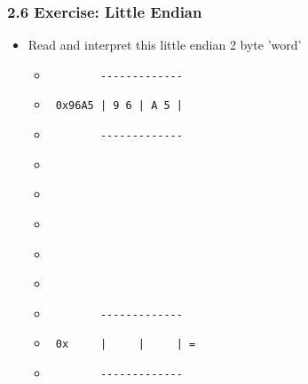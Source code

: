 \begin{frame}[fragile]
  \frametitle{2.6 Exercise: Little Endian}
    \begin{itemize}
        \item[] Read and interpret this little endian 2 byte 'word'
            \begin{itemize}
                \item[] \begin{verbatim}        ------------- \end{verbatim}
                \item[] \begin{verbatim} 0x96A5 | 9 6 | A 5 | \end{verbatim}
                \item[] \begin{verbatim}        ------------- \end{verbatim}
                \item[] \begin{verbatim}                      \end{verbatim}
                \item[] \begin{verbatim}                      \end{verbatim}
                \item[] \begin{verbatim}                      \end{verbatim}
                \item[] \begin{verbatim}                      \end{verbatim}
                \item[] \begin{verbatim}                      \end{verbatim}
                \item[] \begin{verbatim}        ------------- \end{verbatim}
                \item[] \begin{verbatim} 0x     |     |     | =  \end{verbatim}
                \item[] \begin{verbatim}        ------------- \end{verbatim}
            \end{itemize}
    \end{itemize}
\end{frame}


